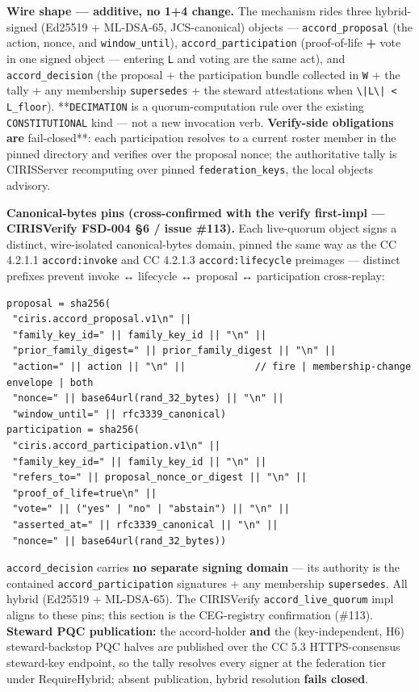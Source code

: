 \documentclass[11pt]{article}
\begin{document}
\textbf{Wire shape — additive, no 1+4 change.} The mechanism rides three hybrid-signed (Ed25519 + ML-DSA-65, JCS-canonical) objects — \texttt{accord\_proposal} (the action, nonce, and \texttt{window\_until}), \texttt{accord\_participation} (proof-of-life \textbf{+} vote in one signed object — entering \texttt{L} and voting are the same act), and \texttt{accord\_decision} (the proposal + the participation bundle collected in \texttt{W} + the tally + any membership \texttt{supersedes} + the steward attestations when \texttt{\textbackslash{}|L\textbackslash{}| < L\_floor}). **\texttt{DECIMATION} is a quorum-computation rule over the existing \texttt{CONSTITUTIONAL} kind — not a new invocation verb.\textbf{ Verify-side obligations are }fail-closed**: each participation resolves to a current roster member in the pinned directory and verifies over the proposal nonce; the authoritative tally is CIRISServer recomputing over pinned \texttt{federation\_keys}, the local objects advisory.


\textbf{Canonical-bytes pins (cross-confirmed with the verify first-impl — CIRISVerify FSD-004 §6 / issue \#113).} Each live-quorum object signs a distinct, wire-isolated canonical-bytes domain, pinned the same way as the CC 4.2.1.1 \texttt{accord:invoke} and CC 4.2.1.3 \texttt{accord:lifecycle} preimages — distinct prefixes prevent invoke ↔ lifecycle ↔ proposal ↔ participation cross-replay:


\begin{lstlisting}
proposal = sha256(
 "ciris.accord_proposal.v1\n" ||
 "family_key_id=" || family_key_id || "\n" ||
 "prior_family_digest=" || prior_family_digest || "\n" ||
 "action=" || action || "\n" ||            // fire | membership-change envelope | both
 "nonce=" || base64url(rand_32_bytes) || "\n" ||
 "window_until=" || rfc3339_canonical)
participation = sha256(
 "ciris.accord_participation.v1\n" ||
 "family_key_id=" || family_key_id || "\n" ||
 "refers_to=" || proposal_nonce_or_digest || "\n" ||
 "proof_of_life=true\n" ||
 "vote=" || ("yes" | "no" | "abstain") || "\n" ||
 "asserted_at=" || rfc3339_canonical || "\n" ||
 "nonce=" || base64url(rand_32_bytes))
\end{lstlisting}

\texttt{accord\_decision} carries \textbf{no separate signing domain} — its authority is the contained \texttt{accord\_participation} signatures + any membership \texttt{supersedes}. All hybrid (Ed25519 + ML-DSA-65). The CIRISVerify \texttt{accord\_live\_quorum} impl aligns to these pins; this section is the CEG-registry confirmation (\#113). \textbf{Steward PQC publication:} the accord-holder \textbf{and} the (key-independent, H6) steward-backstop PQC halves are published over the CC 5.3 HTTPS-consensus steward-key endpoint, so the tally resolves every signer at the federation tier under RequireHybrid; absent publication, hybrid resolution \textbf{fails closed}.
\end{document}
